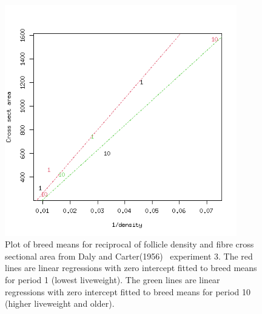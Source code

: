 %

\begin{figure}[h]
  \centering
   \includegraphics[width=0.9\textwidth]{DC1955/expt3reg.png}
  \caption{Plot of breed means for reciprocal of follicle density and fibre cross sectional area from Daly and Carter(1956)~\cite{daly:56} experiment 3.  The red lines are linear regressions  with zero intercept fitted to breed means for period 1 (lowest liveweight). The green lines are linear regressions with zero intercept fitted to breed means for period 10 (higher liveweight and older).}
  \label{fig:dcexpt3reg}
\end{figure}

%

